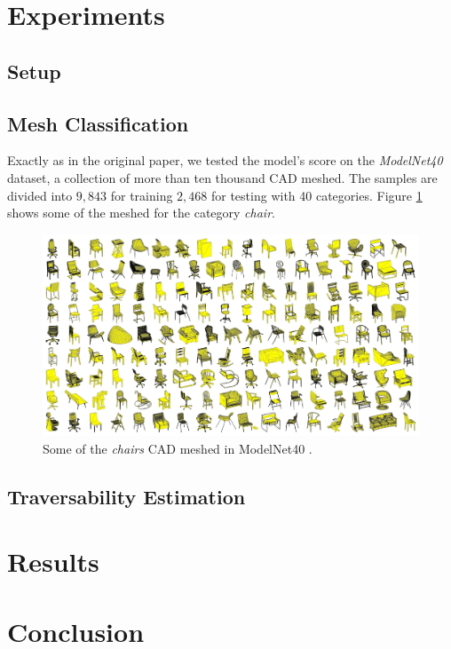 \documentclass[twocolumn,showpacs,
  nofootinbib,aps,superscriptaddress,
  eqsecnum,prd,notitlepage,showkeys,10pt]{article}
\begin{document}
\section{Experiments}
\subsection{Setup}
\subsection{Mesh Classification}
Exactly as in the original paper, we tested the model's score on the \emph{ModelNet40} dataset, a collection of more than ten thousand CAD meshed. The samples are divided into $9,843$ for training $2,468$ for testing with 40 categories. Figure \ref{fig : modelnet} shows some of the meshed for the category \emph{chair}.

\begin{figure}[H]
  \centering
  \includegraphics[width=\linewidth]{images/ModelNet.jpg}
\caption{Some of the \emph{chairs} CAD meshed in ModelNet40 \cite{shapenet}.}
\label{fig : modelnet}
\end{figure}
\subsection{Traversability Estimation}
\section{Results}

\section{Conclusion}
\newpage

\end{document}
